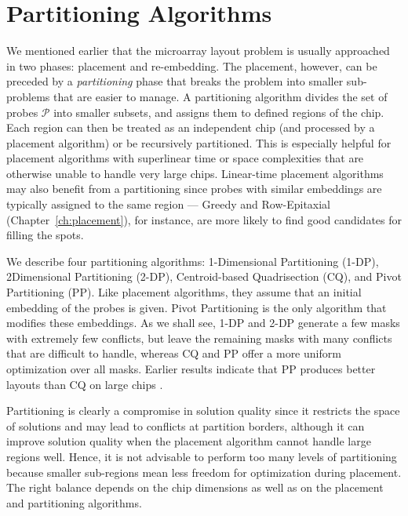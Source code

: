 \chapter{Partitioning Algorithms}
\label{ch:part}

We mentioned earlier that the microarray layout problem is usually approached in
two phases: placement and re-embedding. The placement, however, can be preceded
by a \emph{partitioning} phase that breaks the problem into smaller sub-problems
that are easier to manage. A partitioning algorithm divides the set of probes
$\mathcal{P}$ into smaller subsets, and assigns them to defined regions of the
chip. Each region can then be treated as an independent chip (and processed by a
placement algorithm) or be recursively partitioned. This is especially helpful
for placement algorithms with superlinear time or space complexities that are
otherwise unable to handle very large chips. Linear-time placement algorithms
may also benefit from a partitioning since probes with similar embeddings are
typically assigned to the same region --- Greedy and Row-Epitaxial
(Chapter~\ref{ch:placement}), for instance, are more likely to find good
candidates for filling the spots.

We describe four partitioning algorithms: 1-Dimensional Partitioning (1-DP),
2\hyph Dimensional Partitioning (2-DP), Centroid-based Quadrisection (CQ), and
Pivot Partitioning (PP). Like placement algorithms, they assume that an initial
embedding of the probes is given. Pivot Partitioning is the only algorithm that
modifies these embeddings.  As we shall see, 1-DP and 2-DP generate a few masks
with extremely few conflicts, but leave the remaining masks with many conflicts
that are difficult to handle, whereas CQ and PP offer a more uniform
optimization over all masks. Earlier results indicate that PP produces better
layouts than CQ on large chips \citep{Carvalho2006}.

Partitioning is clearly a compromise in solution quality since it restricts the
space of solutions and may lead to conflicts at partition borders, although it
can improve solution quality when the placement algorithm cannot handle large
regions well. Hence, it is not advisable to perform too many levels of
partitioning because smaller sub-regions mean less freedom for optimization
during placement. The right balance depends on the chip dimensions as well as on
the placement and partitioning algorithms.

